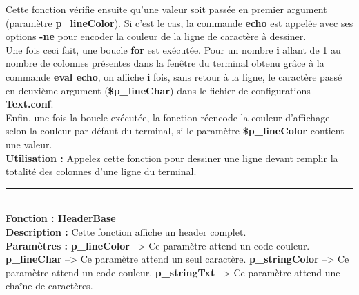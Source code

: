 \documentclass[a4paper,10pt]{article}
\begin{document}
Cette fonction vérifie ensuite qu'une valeur soit passée en premier argument (paramètre \textbf{\color{orange}p\_lineColor\color{white}}). Si c'est le cas, la commande \textbf{\color{gray}echo\color{white}} est appelée avec ses options \textbf{\color{gray}-ne\color{white}} pour encoder la couleur de la ligne de caractère à dessiner.\\[1\baselineskip]

Une fois ceci fait, une boucle \textbf{for} est exécutée. Pour un nombre \textbf{i} allant de 1 au nombre de colonnes présentes dans la fenêtre du terminal obtenu grâce à la commande \textbf{\color{gray}eval echo\color{white}}, on affiche \textbf{i} fois, sans retour à la ligne, le caractère passé en deuxième argument (\textbf{\color{orange}\$p\_lineChar\color{white}}) dans le fichier de\linebreak
configurations \textbf{\color{lime}Text.conf\color{white}}.\\[1\baselineskip]

Enfin, une fois la boucle exécutée, la fonction réencode la couleur d'affichage selon la couleur par\linebreak
défaut du terminal, si le paramètre \textbf{\color{orange}\$p\_lineColor\color{white}} contient une valeur.\\[1\baselineskip]

\textbf{Utilisation :}\linebreak
Appelez cette fonction pour dessiner une ligne devant remplir la totalité des colonnes d'une ligne du terminal.\\[2\baselineskip]


\par\noindent\rule{\textwidth}{0.4pt}\\[1\baselineskip]

\textbf{Fonction : \color{mauve}HeaderBase\color{white}}\\[1\baselineskip]
\textbf{Description :}\linebreak
Cette fonction affiche un header complet.\\[1\baselineskip]

\textbf{Paramètres :}\linebreak
\textbf{\color{orange}p\_lineColor\color{white}} --> Ce paramètre attend un code couleur.\linebreak
\textbf{\color{orange}p\_lineChar\color{white}} --> Ce paramètre attend un seul caractère.\linebreak
\textbf{\color{orange}p\_stringColor\color{white}} --> Ce paramètre attend un code couleur.\linebreak
\textbf{\color{orange}p\_stringTxt\color{white}} --> Ce paramètre attend une chaîne de caractères.\\[1\baselineskip]
\end{document}
